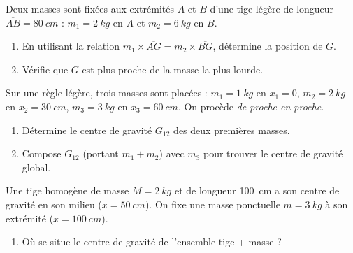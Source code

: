 \documentclass[11pt,a4paper]{article}
\begin{document}
\begin{exo}
Deux masses sont fixées aux extrémités $A$ et $B$ d'une tige légère de longueur
$\overline{AB}=\qty{80}{cm}$ : $m_1=\qty{2}{kg}$ en $A$ et $m_2=\qty{6}{kg}$ en $B$.
\begin{enumerate}[label=\alph*)]
  \item En utilisant la relation $m_1\times\overline{AG}=m_2\times\overline{BG}$, détermine la position
        de $G$.
  \item Vérifie que $G$ est plus proche de la masse la plus lourde.
\end{enumerate}
\end{exo}

\begin{exo}
Sur une règle légère, trois masses sont placées : $m_1=\qty{1}{kg}$ en $x_1=0$, $m_2=\qty{2}{kg}$ en
$x_2=\qty{30}{cm}$, $m_3=\qty{3}{kg}$ en $x_3=\qty{60}{cm}$. On procède \emph{de proche en proche}.
\begin{enumerate}[label=\alph*)]
  \item Détermine le centre de gravité $G_{12}$ des deux premières masses.
  \item Compose $G_{12}$ (portant $m_1+m_2$) avec $m_3$ pour trouver le centre de gravité global.
\end{enumerate}
\end{exo}

\begin{exo}
Une tige homogène de masse $M=\qty{2}{kg}$ et de longueur \qty{100}{cm} a son centre de gravité en
son milieu ($x=\qty{50}{cm}$). On fixe une masse ponctuelle $m=\qty{3}{kg}$ à son extrémité
($x=\qty{100}{cm}$).
\begin{enumerate}[label=\alph*)]
  \item Où se situe le centre de gravité de l'ensemble {tige + masse} ?
\end{enumerate}
\end{exo}
\end{document}
